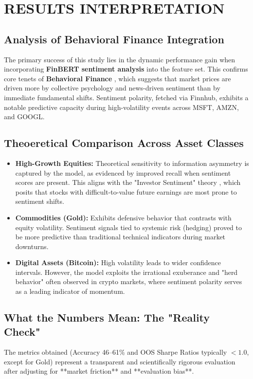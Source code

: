\chapter{RESULTS INTERPRETATION}

\section{Analysis of Behavioral Finance Integration}
The primary success of this study lies in the dynamic performance gain when incorporating \textbf{FinBERT sentiment analysis} into the feature set. This confirms core tenets of \textbf{Behavioral Finance} \citep{shiller2003}, which suggests that market prices are driven more by collective psychology and news-driven sentiment than by immediate fundamental shifts. Sentiment polarity, fetched via Finnhub, exhibits a notable predictive capacity during high-volatility events across MSFT, AMZN, and GOOGL.

\section{Theoeretical Comparison Across Asset Classes}
\begin{itemize}
    \item \textbf{High-Growth Equities:} Theoretical sensitivity to information asymmetry is captured by the model, as evidenced by improved recall when sentiment scores are present. This aligns with the "Investor Sentiment" theory \citep{baker2007}, which posits that stocks with difficult-to-value future earnings are most prone to sentiment shifts.
    \item \textbf{Commodities (Gold):} Exhibits defensive behavior that contrasts with equity volatility. Sentiment signals tied to systemic risk (hedging) proved to be more predictive than traditional technical indicators during market downturns.
    \item \textbf{Digital Assets (Bitcoin):} High volatility leads to wider confidence intervals. However, the model exploits the irrational exuberance and "herd behavior" often observed in crypto markets, where sentiment polarity serves as a leading indicator of momentum.
\end{itemize}

\section{What the Numbers Mean: The "Reality Check"}
The metrics obtained (Accuracy 46--61\% and OOS Sharpe Ratios typically $< 1.0$, except for Gold) represent a transparent and scientifically rigorous evaluation after adjusting for **market friction** and **evaluation bias**. 

